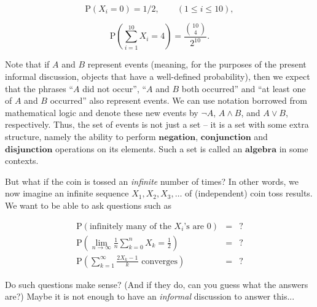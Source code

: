 \documentclass[11pt]{report}
\theoremstyle{plain}
\theoremstyle{definition}
\begin{document}
\[
\mathrm{P}(X_i = 0) = 1/2, \qquad (1\le i\le 10),
\]

\[
\mathrm{P}\left(\sum_{i=1}^{10} X_i = 4\right) = \frac{\binom{10}{4}}{2^{10}}.
\]

Note that if $A$ and $B$ represent events (meaning,
for the purposes of the present informal discussion,
objects that have a well-defined probability), then we
expect that the phrases ``$A$ did not occur'', ``$A$
and $B$ both occurred'' and ``at least one of $A$ and
$B$ occurred'' also represent events. We can use
notation borrowed from mathematical logic and denote
these new events by $\lnot A$, $A\wedge B$, and
$A \vee B$, respectively. Thus, the set of events is
not just a set -- it is a set with some extra
structure, namely the ability to perform
$\textbf{negation}$, $\textbf{conjunction}$ and
$\textbf{disjunction}$ operations on its elements.
Such a set is called an $\textbf{algebra}$ in some
contexts.

But what if the coin is tossed an \emph{infinite} number
of times? In other words, we now imagine an infinite
sequence $X_1,X_2,X_3,\ldots$ of (independent) coin
toss results. We want to be able to ask questions such
as

\begin{eqnarray*}
\mathrm{P}(\textrm{infinitely many of the $X_i$'s are 0}) &=& ? \\
\mathrm{P}\left(\lim_{n\to\infty} \frac{1}{n} \sum_{k=0}^n X_k = \frac12\right) &=& ? \\
\mathrm{P}\left(\sum_{k=1}^\infty \frac{2X_k-1}{k}\textrm{ converges}\right) &=& ?
\end{eqnarray*}

Do such questions make sense? (And if they do, can
you guess what the answers are?) Maybe it is not
enough to have an \emph{informal} discussion to answer
this...
\end{document}
